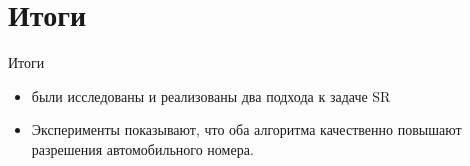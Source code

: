 \section{Итоги}

\begin{frame}{Итоги}
  \begin{itemize}

    \item были исследованы и реализованы два подхода к задаче SR
    \item Эксперименты показывают, что оба алгоритма качественно повышают разрешения автомобильного
      номера.
  \end{itemize}
\end{frame}
